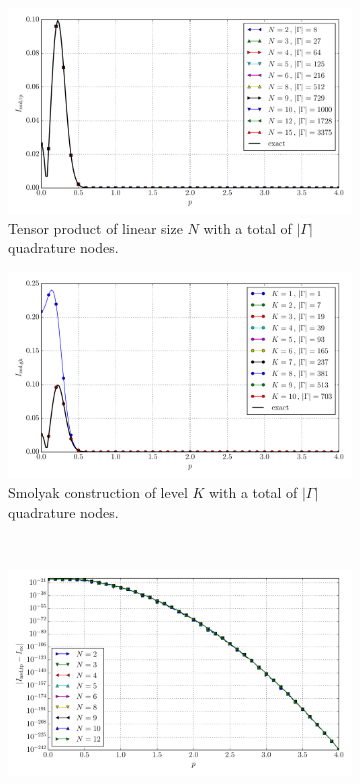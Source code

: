 \documentclass[a4paper,10pt]{article}
\begin{document}
\begin{figure}[ht!]
  \begin{subfigure}[t]{0.5\linewidth}
    \includegraphics[width=\linewidth]{./plots/tp_sg_3d_conv_p_(0,1,1)_(1,1,0)_val_nsd_tp.pdf}
    \caption{Tensor product of linear size $N$ with a total of $|\Gamma|$ quadrature nodes.}
    \label{fig:tp_sg_3d_conv_p_011_110_val_nsd_tp}
  \end{subfigure}
  \begin{subfigure}[t]{0.5\linewidth}
    \includegraphics[width=\linewidth]{./plots/tp_sg_3d_conv_p_(0,1,1)_(1,1,0)_val_nsd_gk.pdf}
    \caption{Smolyak construction of level $K$ with a total of $|\Gamma|$ quadrature nodes.}
    \label{fig:tp_sg_3d_conv_p_011_110_val_nsd_gk}
  \end{subfigure} \\
  \begin{subfigure}[t]{0.5\linewidth}
    \includegraphics[width=\linewidth]{./plots/tp_sg_3d_conv_p_(0,1,1)_(1,1,0)_err_nsd_tp.pdf}

\end{subfigure}
\end{figure}
\end{document}
